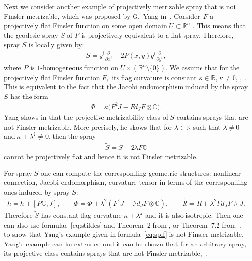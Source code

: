 \documentclass[pdftex]{sigma}
\numberwithin{equation}{section}
\begin{document}
Next we consider another example of projectively metrizable spray that
is not Finsler metrizable, which was proposed by G.~Yang in~\cite{yang11}. Consider~$F$ a projectively f\/lat Finsler function on some open domain $U\subset
\mathbb{R}^n$ \cite[\S~13.5]{shen01}. This means that the geodesic
spray $S$ of $F$ is projectively equivalent to a f\/lat
spray. Therefore, spray $S$ is locally given by:
\begin{gather*}
S=y^i\frac{\partial}{\partial x^i}- 2P(x,y)y^i\frac{\partial}{\partial
  y^i}, %
  \end{gather*} where $P$ is $1$-homogeneous
function on $U\times (\mathbb{R}^n\setminus\{0\})$.
We assume that for the projectively f\/lat Finsler function $F,$ its f\/lag curvature is
constant $\kappa \in \mathbb{R}$, $\kappa \neq 0$, \cite[\S~3.5]{grifone00}, \cite[\S~11.1]{shen01}.
This is equivalent to the fact that the Jacobi endomorphism induced by
the spray $S$ has the form
\begin{gather*}
\Phi=\kappa\big(F^2J - Fd_JF\otimes \mathbb{C}\big). %
\end{gather*}
Yang shows in \cite[Theorem~1.2]{yang11} that the projective metrizability class of
$S$ contains sprays that are not Finsler metrizable. More precisely, he
shows that for $\lambda \in \mathbb{R}$ such that $\lambda\neq 0$ and
$\kappa+\lambda^2\neq 0$,  then the spray
\begin{gather} \widetilde{S}=S-2\lambda
  F\mathbb{C}\label{eq:splf} \end{gather} cannot be projectively
f\/lat and hence it is not Finsler metrizable.

For spray $\widetilde{S}$ one can compute the corresponding
geometric structures: nonlinear connection,
Jacobi endomorphism, curvature tensor in terms of the corresponding
ones induced by spray $S$:
\begin{gather}
\widetilde{h}   =   h+[P\mathbb{C}, J], \qquad
\label{eq:stildes} \widetilde{\Phi}   =   \Phi+ \lambda^2(F^2J- F d_JF \otimes
\mathbb{C}), \qquad
\widetilde{R}   =   R + \lambda^2 Fd_JF \wedge J.
\end{gather}
Therefore $\widetilde{S}$ has constant f\/lag curvature $\kappa+\lambda^2$
and it is also isotropic. Then one can also use formulae~\eqref{eq:stildes} and Theorem~2 from \cite{muzsnay06}, or Theorem~7.2 from~\cite{grifone00}, to show
that Yang's example  given in formula~\eqref{eq:splf}  is not Finsler
metrizable. Yang's example can be extended and it can be shown that
for an arbitrary spray, its projective class contains sprays that are not Finsler
metrizable,~\cite{bm11}.
\end{document}
